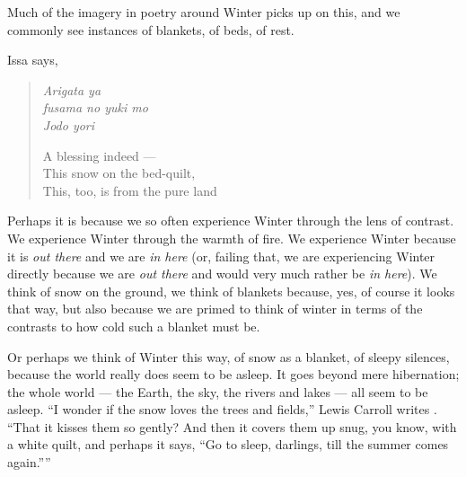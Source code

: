 \documentclass[12pt,oneside]{memoir}
\begin{document}
Much of the imagery in poetry around Winter picks up on this, and we commonly see instances of blankets, of beds, of rest.

Issa says,

\begin{verse}
\begin{multicols}{2}
\emph{Arigata ya} \\
\emph{fusama no yuki mo} \\
\emph{Jodo yori}

\columnbreak

A blessing indeed --- \\
This snow on the bed-quilt, \\
This, too, is from the pure land
\end{multicols}
\parencite[46]{issa}
\end{verse}

Perhaps it is because we so often experience Winter through the lens of contrast. We experience Winter through the warmth of fire. We experience Winter because it is \emph{out there} and we are \emph{in here} (or, failing that, we are experiencing Winter directly because we are \emph{out there} and would very much rather be \emph{in here}). We think of snow on the ground, we think of blankets because, yes, of course it looks that way, but also because we are primed to think of winter in terms of the contrasts to how cold such a blanket must be.

Or perhaps we think of Winter this way, of snow as a blanket, of sleepy silences, because the world really does seem to be asleep. It goes beyond mere hibernation; the whole world --- the Earth, the sky, the rivers and lakes --- all seem to be asleep. ``I wonder if the snow loves the trees and fields,'' Lewis Carroll writes \parencite{carroll}. ``That it kisses them so gently? And then it covers them up snug, you know, with a white quilt, and perhaps it says, ``Go to sleep, darlings, till the summer comes again.''''
\end{document}
